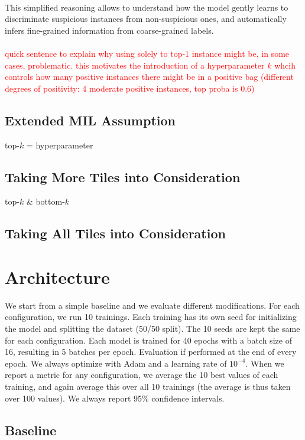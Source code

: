 \documentclass[final]{cvpr}
\begin{document}
	 \\
	 This simplified reasoning allows to understand	how the model gently learns to discriminate suspicious instances from non-suspicious ones, and automatically infers fine-grained information from coarse-grained labels.\\
	 \\
	 \textcolor{red}{quick sentence to explain why using solely to top-$1$ instance might be, in some cases, problematic. this motivates the introduction of a hyperparameter $k$ whcih controls how many positive instances there might be in a positive bag (different degrees of positivity: 4 moderate positive instances, top proba is 0.6)}

	\subsection{Extended  MIL Assumption} 
	
	top-$k$ = hyperparameter

	\subsection{Taking More Tiles into Consideration}
	
	top-$k$ \& bottom-$k$
	
	\subsection{Taking All Tiles into Consideration}

	
	\section{Architecture}
	
	We start from a simple baseline and we evaluate different modifications.
	For each configuration, we run 10 trainings. Each training has its own seed for initializing the model and splitting the dataset (50/50 split). The 10 seeds are kept the same for each configuration. Each model is trained for 40 epochs with a batch size of 16, resulting in 5 batches per epoch. Evaluation if performed at the end of every epoch. We always optimize with Adam and a learning rate of $10^{-4}$. When we report a metric for any configuration, we average the 10 best values of each training, and again average this over all 10 trainings (the average is thus taken over 100 values). We always report 95\% confidence intervals.
	
	\subsection{Baseline}
	
\end{document}
